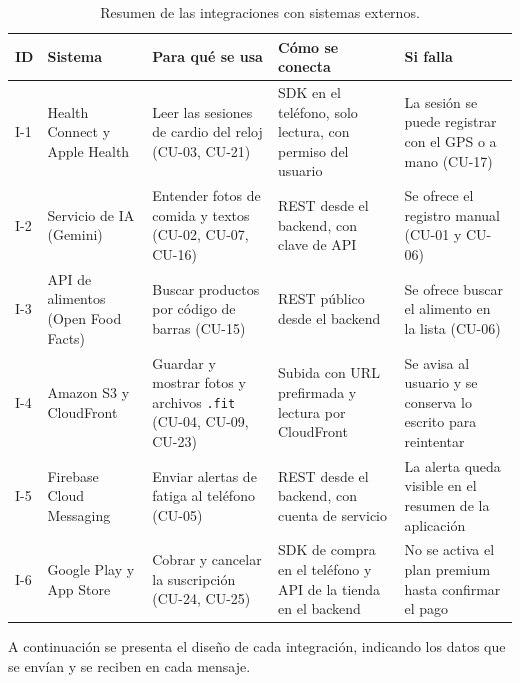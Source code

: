 \begin{table}[h!]
    \centering
    \renewcommand{\arraystretch}{1.25}
    \footnotesize
    \begin{tabular}{|p{0.7cm}|>{\raggedright\arraybackslash}p{2.6cm}|>{\raggedright\arraybackslash}p{3.8cm}|>{\raggedright\arraybackslash}p{3.3cm}|>{\raggedright\arraybackslash}p{3.8cm}|}
        \hline
        \rowcolor[HTML]{EFEFEF}
        \textbf{ID} & \textbf{Sistema} & \textbf{Para qué se usa} & \textbf{Cómo se conecta} & \textbf{Si falla} \\ \hline
        I-1 & Health Connect y Apple Health & Leer las sesiones de cardio del reloj (CU-03, CU-21) & SDK en el teléfono, solo lectura, con permiso del usuario & La sesión se puede registrar con el GPS o a mano (CU-17) \\ \hline
        I-2 & Servicio de IA (Gemini) & Entender fotos de comida y textos (CU-02, CU-07, CU-16) & REST desde el backend, con clave de API & Se ofrece el registro manual (CU-01 y CU-06) \\ \hline
        I-3 & API de alimentos (Open Food Facts) & Buscar productos por código de barras (CU-15) & REST público desde el backend & Se ofrece buscar el alimento en la lista (CU-06) \\ \hline
        I-4 & Amazon S3 y CloudFront & Guardar y mostrar fotos y archivos \texttt{.fit} (CU-04, CU-09, CU-23) & Subida con URL prefirmada y lectura por CloudFront & Se avisa al usuario y se conserva lo escrito para reintentar \\ \hline
        I-5 & Firebase Cloud Messaging & Enviar alertas de fatiga al teléfono (CU-05) & REST desde el backend, con cuenta de servicio & La alerta queda visible en el resumen de la aplicación \\ \hline
        I-6 & Google Play y App Store & Cobrar y cancelar la suscripción (CU-24, CU-25) & SDK de compra en el teléfono y API de la tienda en el backend & No se activa el plan premium hasta confirmar el pago \\ \hline
    \end{tabular}
    \caption{Resumen de las integraciones con sistemas externos.}
    \label{tab:integraciones}
\end{table}
A continuación se presenta el diseño de cada integración, indicando los datos que se envían y se reciben en cada mensaje.
\vspace{0.4cm}

